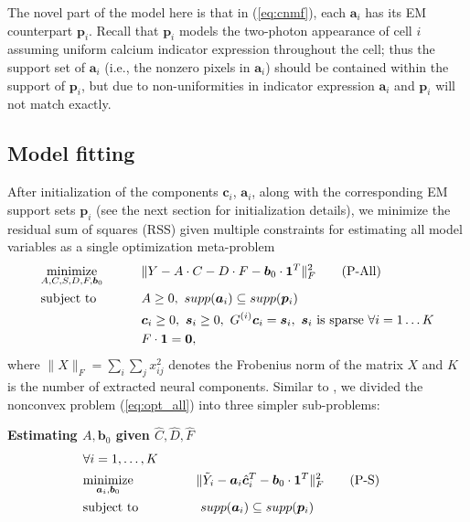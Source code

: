 \documentclass[10pt,letterpaper]{article}
\begin{document}
{The novel part of the model here is that in (\ref{eq:cnmf}), each $\bm{a}_i$ has its EM counterpart $\bm{p}_i$.  Recall that $\bm{p}_i$ models the two-photon appearance of cell $i$ assuming uniform calcium indicator expression throughout the cell; thus the support set of $\bm{a}_i$ (i.e., the nonzero pixels in $\bm{a}_i$) should be contained within the support of $\bm{p}_i$, but due to non-uniformities in indicator expression $\bm{a}_i$ and $\bm{p}_i$ will not match exactly.  



\subsection{Model fitting}
After initialization of the components $\bm{c}_i$, $\bm{a}_i$, along with the corresponding EM support sets $\bm{p}_i$ (see the next section for initialization details), we minimize the residual sum of squares (RSS) given multiple constraints 
for estimating all model variables as a single optimization meta-problem 
\begin{alignat}{2}
&\underset{A,C,S, D, F,\bm{b}_0}{\text{minimize}} &\qquad& \|Y-A\cdot C - D\cdot F- \bm{b}_0\cdot \bm{1}^T\|_F^2 \label{eq:opt_all}\tag{P-All}\\
&\text{subject to} &\quad& A\geq 0, ~supp(\bm{a}_i) \subseteq supp(\bm{p}_i) \notag\\
 &&&\bm{c}_i\geq 0,~ \bm{s}_i\geq 0, ~G^{(i)}\bm{c}_i = \bm{s}_i, ~ \bm{s}_i \text{ is sparse}~\forall i=1\ldots K\notag\\
&&& F\cdot \bm{1}= \bm{0}, \notag
\end{alignat}
where $\|X\|_F = \sum_i\sum_j x_{ij}^2$ denotes the Frobenius norm of the matrix $X$ and $K$ is the number of extracted neural components. Similar to \citep{Zhou2018}, we divided the nonconvex problem (\ref{eq:opt_all}) into three simpler sub-problems: 

\textbf{Estimating $A, \bm{b}_0$ given $\hat{C}, \hat{D}, \hat{F}$}
\begin{alignat}{2}
& \forall i=1, \hdots, K \notag\\
&\underset{\bm{a}_i,\bm{b}_0}{\text{minimize}} &\qquad& \|\tilde{Y}_i-{\bm{a}}_i\hat{\bm{c}}_i^T - \bm{b}_0\cdot \bm{1}^T\|_F^2 \label{eq:opt_A}\tag{P-S}\\
&\text{subject to}&&   ~supp(\bm{a}_i) \subseteq supp(\bm{p}_i) \notag
\end{alignat}

}
\end{document}

